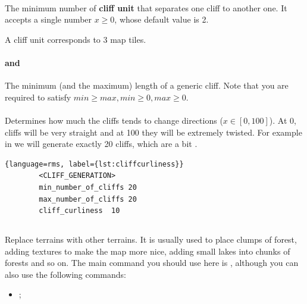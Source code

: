     \paragraph{}

    The minimum number of \textbf{cliff unit} that separates one cliff to another one. It accepts a single number $x \geq 0$, whose default value is 2.

    \begin{definition}
        A cliff unit corresponds to 3 map tiles.
    \end{definition}

    \paragraph{ and }

    The minimum (and the maximum) length of a generic cliff. Note that you are required to satisfy $min \geq max, min \geq 0, max \geq 0$.

    \paragraph{}

    Determines how much the cliffs tends to change directions ($x \in [0, 100]$). At 0, cliffs will be very straight and at 100 they will be extremely twisted. For example in  we will generate exactly 20 cliffs, which are a bit .

    \begin{lstlisting}{language=rms, label={lst:cliffcurliness}}
        <CLIFF_GENERATION>
        min_number_of_cliffs 20
        max_number_of_cliffs 20
        cliff_curliness  10
    \end{lstlisting}

    \subsection{}

    Replace terrains with other terrains. It is usually used to place clumps of forest, adding textures to make the map more nice, adding small lakes into chunks of forests and so on. The main command you should use here is , although you can also use the following commands:

    \begin{itemize}
        \item {};
    \end{itemize}



